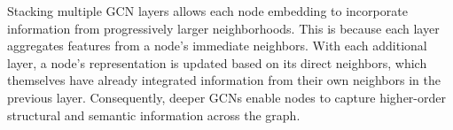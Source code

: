 Stacking multiple GCN layers allows each node embedding to incorporate information from progressively larger neighborhoods. This is because each layer aggregates features from a node’s immediate neighbors. With each additional layer, a node’s representation is updated based on its direct neighbors, which themselves have already integrated information from their own neighbors in the previous layer. Consequently, deeper GCNs enable nodes to capture higher-order structural and semantic information across the graph.





